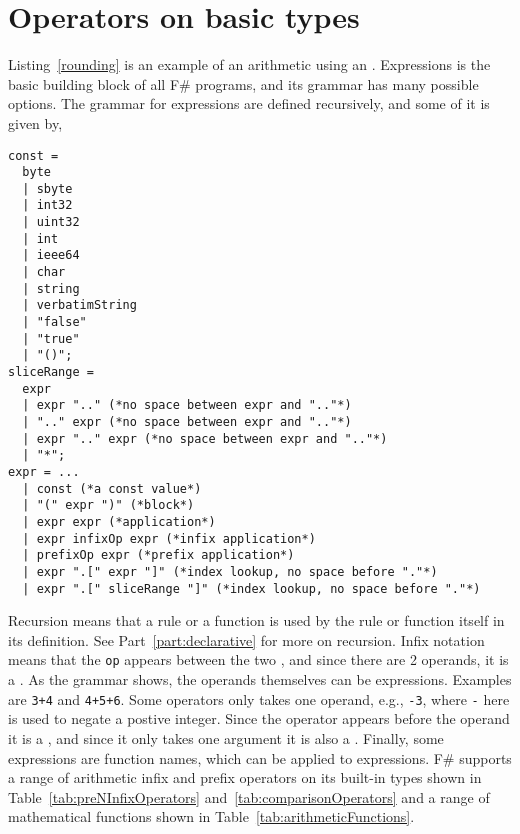 \section{Operators on basic types}
Listing~\ref{rounding} is an example of an arithmetic  using an . Expressions is the basic building block of all F\# programs, and its grammar has many possible options. The grammar for expressions are defined recursively, and some of it is given by, 
%
\begin{lstlisting}[language=ebnf,caption=expressionArithmetic]
const =
  byte
  | sbyte
  | int32
  | uint32 
  | int
  | ieee64 
  | char
  | string
  | verbatimString
  | "false"
  | "true"
  | "()";
sliceRange = 
  expr 
  | expr ".." (*no space between expr and ".."*)
  | ".." expr (*no space between expr and ".."*)
  | expr ".." expr (*no space between expr and ".."*)
  | "*";
expr = ...
  | const (*a const value*)
  | "(" expr ")" (*block*)
  | expr expr (*application*)
  | expr infixOp expr (*infix application*)
  | prefixOp expr (*prefix application*)
  | expr ".[" expr "]" (*index lookup, no space before "."*)
  | expr ".[" sliceRange "]" (*index lookup, no space before "."*)
\end{lstlisting}
%
Recursion means that a rule or a function is used by the rule or function itself in its definition. See Part~\ref{part:declarative} for more on recursion. Infix notation means that the  \lstinline[language=ebnf]!op! appears between the two , and since there are 2 operands, it is a . As the grammar shows, the operands themselves can be expressions. Examples are \lstinline!3+4! and \lstinline!4+5+6!. Some operators only takes one operand, e.g., \lstinline!-3!, where \lstinline!-! here is used to negate a postive integer. Since the operator appears before the operand it is a , and since it only takes one argument it is also a . Finally, some expressions are function names, which can be applied to expressions. F\# supports a range of arithmetic infix and prefix operators on its built-in types shown in Table~\ref{tab:preNInfixOperators} and~\ref{tab:comparisonOperators} and a range of mathematical functions shown in Table~\ref{tab:arithmeticFunctions}.
